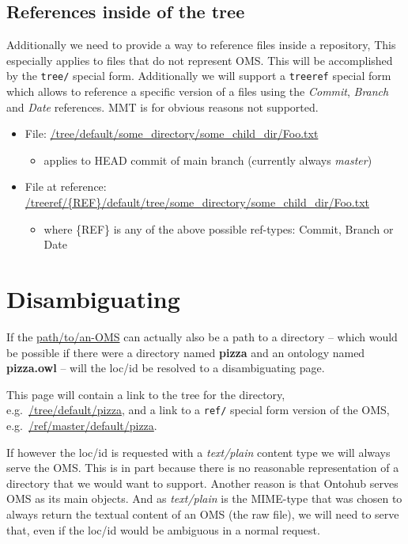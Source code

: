 \documentclass[10pt,fleqn,%
\ifpretendfinal
final%
\else
draft%
\fi,
]{scrreprt}
\begin{document}
\subsection{References inside of the tree}

Additionally we need to provide a way to reference files inside a repository,
This especially applies to files that do not represent OMS. This
will be accomplished by the \texttt{tree/} special form. Additionally
we will support a \texttt{treeref} special form which allows to reference
a specific version of a files using the \emph{Commit}, \emph{Branch} and
\emph{Date} references. MMT is for obvious reasons not supported.

\begin{itemize}
  \item File: \url{/tree/default/some_directory/some_child_dir/Foo.txt}
    \begin{itemize}
      \item applies to HEAD commit of main branch (currently always \emph{master})
    \end{itemize}
  \item File at reference: \url{/treeref/{REF}/default/tree/some_directory/some_child_dir/Foo.txt}
    \begin{itemize}
      \item where \{REF\} is any of the above possible ref-types: Commit, Branch or Date
    \end{itemize}
\end{itemize}

\section{Disambiguating}

If the \url{path/to/an-OMS} can actually also be a path to a directory  --
which would be possible if there were a directory named \textbf{pizza} and an
ontology named \textbf{pizza.owl} -- will the loc/id be resolved to a
disambiguating page.

This page will contain a link to the tree for the directory, e.g.\ 
\url{/tree/default/pizza}, and a link to a \texttt{ref/} special form
version of the OMS, e.g.\ \url{/ref/master/default/pizza}.

If however the loc/id is requested with a \emph{text/plain} content type we
will always serve the OMS. This is in part because there is no reasonable
representation of a directory that we would want to support. Another reason is
that Ontohub serves OMS as its main objects. And as \emph{text/plain} is
the MIME-type that was chosen to always return the textual content of an
OMS (the raw file), we will need to serve that, even if the loc/id would
be ambiguous in a normal request.
\end{document}
